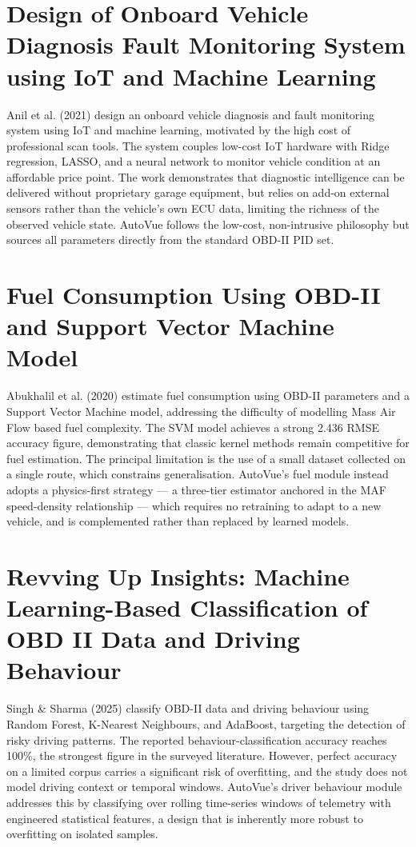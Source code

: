\documentclass[10pt,a4paper]{report}
\begin{document}
\section{Design of Onboard Vehicle Diagnosis Fault Monitoring System using IoT and Machine Learning}

Anil et al. (2021) \cite{article3} design an onboard vehicle diagnosis and fault monitoring system using IoT and machine learning, motivated by the high cost of professional scan tools. The system couples low-cost IoT hardware with Ridge regression, LASSO, and a neural network to monitor vehicle condition at an affordable price point. The work demonstrates that diagnostic intelligence can be delivered without proprietary garage equipment, but relies on add-on external sensors rather than the vehicle's own ECU data, limiting the richness of the observed vehicle state. AutoVue follows the low-cost, non-intrusive philosophy but sources all parameters directly from the standard OBD-II PID set.

\section{Fuel Consumption Using OBD-II and Support Vector Machine Model}

Abukhalil et al. (2020) \cite{article4} estimate fuel consumption using OBD-II parameters and a Support Vector Machine model, addressing the difficulty of modelling Mass Air Flow based fuel complexity. The SVM model achieves a strong 2.436 RMSE accuracy figure, demonstrating that classic kernel methods remain competitive for fuel estimation. The principal limitation is the use of a small dataset collected on a single route, which constrains generalisation. AutoVue's fuel module instead adopts a physics-first strategy — a three-tier estimator anchored in the MAF speed-density relationship — which requires no retraining to adapt to a new vehicle, and is complemented rather than replaced by learned models.

\section{Revving Up Insights: Machine Learning-Based Classification of OBD II Data and Driving Behaviour}

Singh \& Sharma (2025) \cite{article5} classify OBD-II data and driving behaviour using Random Forest, K-Nearest Neighbours, and AdaBoost, targeting the detection of risky driving patterns. The reported behaviour-classification accuracy reaches 100\%, the strongest figure in the surveyed literature. However, perfect accuracy on a limited corpus carries a significant risk of overfitting, and the study does not model driving context or temporal windows. AutoVue's driver behaviour module addresses this by classifying over rolling time-series windows of telemetry with engineered statistical features, a design that is inherently more robust to overfitting on isolated samples.
\end{document}
